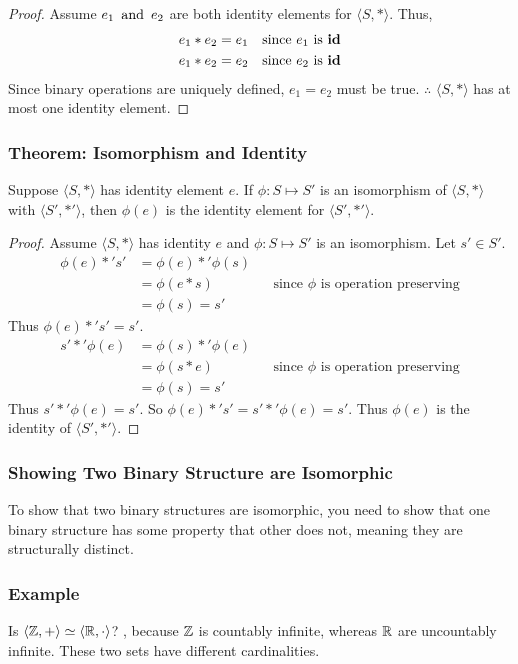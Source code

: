 \begin{proof}
    Assume $e_1 \operatorname{~\text{and}~} e_2$ are both identity elements for $\langle S, * \rangle$. Thus,
    \begin{align*}
        e_1 * e_2 & = e_1 && \text{since $e_1$ is $\operatorname{\textbf{id}}$} \\
        e_1 * e_2 & = e_2 && \text{since $e_2$ is $\operatorname{\textbf{id}}$}
    \end{align*}
    Since binary operations are uniquely defined, $e_1 = e_2$ must be true.
    $\therefore$ $\langle S, * \rangle$ has at most one identity element.
\end{proof}

\subsubsection*{Theorem: Isomorphism and Identity}
Suppose $\langle S, * \rangle$ has identity element $e$. If $\phi: S \mapsto S'$ is an isomorphism of $\langle S, * \rangle$ with $\langle S', *' \rangle$, then $\phi(e)$ is the identity element for $\langle S', *' \rangle$.

\begin{proof}
    Assume $\langle S, * \rangle$ has identity $e$ and $\phi: S \mapsto S'$ is an isomorphism. Let $s' \in S'$.
    \begin{align*}
        \phi(e) *' s' & = \phi(e) *' \phi(s) \\
        & = \phi(e * s) && \text{since $\phi$ is operation preserving} \\
        & = \phi(s) = s'
    \end{align*}
    Thus $\phi(e) *' s' = s'$.
    \begin{align*}
        s' *' \phi(e) & = \phi(s) *' \phi(e) \\
        & = \phi(s * e) && \text{since $\phi$ is operation preserving} \\
        & = \phi(s) = s'
    \end{align*}
    Thus $s' *' \phi(e) = s'$. So $\phi(e) *' s' = s' *' \phi(e) = s'$. Thus $\phi(e)$ is the identity of $\langle S', *' \rangle$.
\end{proof}

\subsubsection*{Showing Two Binary Structure are  Isomorphic}
To show that two binary structures are  isomorphic, you need to show that one binary structure has some property that other does not, meaning they are structurally distinct.

\subsubsection*{Example}
Is $\langle \mathbb{Z},+ \rangle \simeq \langle \mathbb{R}, \cdot \rangle$? , because $\mathbb{Z}$ is countably infinite, whereas $\mathbb{R}$ are uncountably infinite. These two sets have different cardinalities.